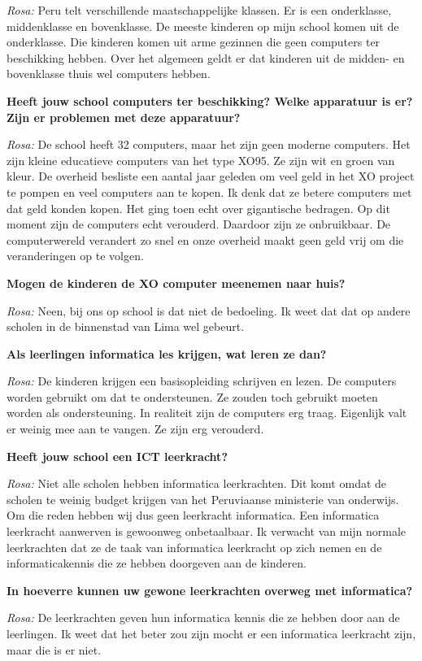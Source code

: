 \textit{Rosa:} Peru telt verschillende maatschappelijke klassen. Er is een onderklasse, middenklasse en bovenklasse. De meeste kinderen op mijn school komen uit de onderklasse. Die kinderen komen uit arme gezinnen die geen computers ter beschikking hebben. Over het algemeen geldt er dat kinderen uit de midden- en bovenklasse thuis wel computers hebben.

\textbf{Heeft jouw school computers ter beschikking? Welke apparatuur is er? Zijn er problemen met deze apparatuur?}

\textit{Rosa:} De school heeft 32 computers, maar het zijn geen moderne computers. Het zijn kleine educatieve computers van het type XO95. Ze zijn wit en groen van kleur. De overheid besliste een aantal jaar geleden om veel geld in het XO project te pompen en veel computers aan te kopen. Ik denk dat ze betere computers met dat geld konden kopen. Het ging toen echt over gigantische bedragen. Op dit moment zijn de computers echt verouderd. Daardoor zijn ze onbruikbaar. De computerwereld verandert zo snel en onze overheid maakt geen geld vrij om die veranderingen op te volgen.

\textbf{Mogen de kinderen de XO computer meenemen naar huis?}

\textit{Rosa:} Neen, bij ons op school is dat niet de bedoeling. Ik weet dat dat op andere scholen in de binnenstad van Lima wel gebeurt.

\textbf{Als leerlingen informatica les krijgen, wat leren ze dan?}

\textit{Rosa:} De kinderen krijgen een basisopleiding schrijven en lezen. De computers worden gebruikt om dat te ondersteunen. Ze zouden toch gebruikt moeten worden als ondersteuning. In realiteit zijn de computers erg traag. Eigenlijk valt er weinig mee aan te vangen. Ze zijn erg verouderd.

\textbf{Heeft jouw school een ICT leerkracht?}

\textit{Rosa:} Niet alle scholen hebben informatica leerkrachten. Dit komt omdat de scholen te weinig budget krijgen van het Peruviaanse ministerie van onderwijs. Om die reden hebben wij dus geen leerkracht informatica. Een informatica leerkracht aanwerven is gewoonweg onbetaalbaar. Ik verwacht van mijn normale leerkrachten dat ze de taak van informatica leerkracht op zich nemen en de informaticakennis die ze hebben doorgeven aan de kinderen.

\textbf{In hoeverre kunnen uw gewone leerkrachten overweg met informatica?}

\textit{Rosa:} De leerkrachten geven hun informatica kennis die ze hebben door aan de leerlingen. Ik weet dat het beter zou zijn mocht er een informatica leerkracht zijn, maar die is er niet.


